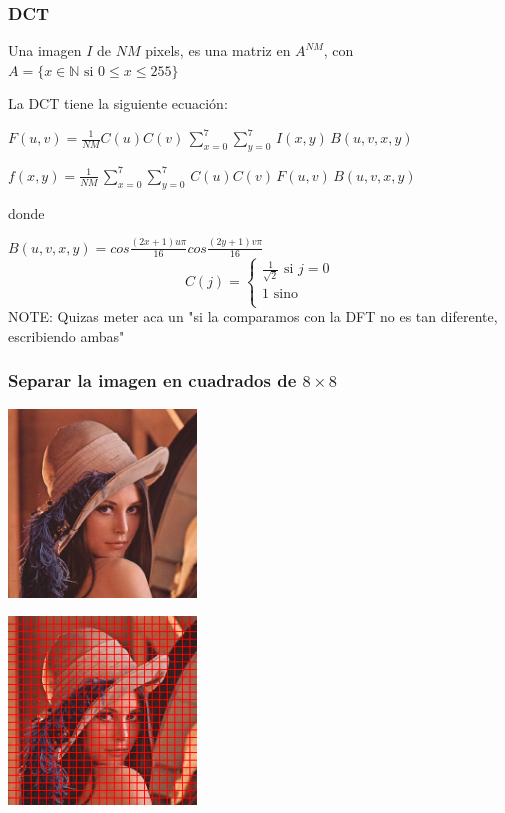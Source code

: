 \documentclass{beamer}
\begin{document}
\begin{frame}
    \frametitle{DCT}
    \begin{center}
        Una imagen $I$ de $NM$ pixels, es una matriz en $A^{NM}$, con $A = \{x \in \mathbb{N} \text{ si
        $0 \leq x \leq 255$}\}$ \vspace{6mm}

        La DCT tiene la siguiente ecuación:\vspace{6mm}

        $F(u,v)=\frac{1}{NM}C(u)C(v)\,\sum_{x=0}^{7} \sum_{y=0}^{7}\,I(x,y)\,B(u,v,x,y)$

        \vspace{3mm} 
        $f(x,y)=\frac{1}{NM}\,\sum_{x=0}^{7} \sum_{y=0}^{7}\,C(u)C(v)\,F(u,v)\,B(u,v,x,y)$

        \vspace{3mm}
        donde
        \vspace{3mm}

        $B(u,v,x,y) = cos\frac{(2x+1)u\pi}{16}cos\frac{(2y+1)v\pi}{16}$
        \[   
        C(j) = 
             \begin{cases}
                 \frac{1}{\sqrt{2}}\text{ si $j=0$}\\
                 1 \text{ sino}\\
             \end{cases}
        \]
        NOTE: Quizas meter aca un "si la comparamos con la DFT no es tan diferente, escribiendo
        ambas"
    \end{center}
\end{frame}

\begin{frame}
    \frametitle{Separar la imagen en cuadrados de $8 \times 8$}
    \begin{minipage}[t]{0.48\linewidth}
        \includegraphics[width=5cm, height=5cm]{fig/lena.png}
    \end{minipage}
    \hfill
    \begin{minipage}[t]{0.48\linewidth}
        \includegraphics[width=5cm, height=5cm]{fig/lena_blocks.png}
    \end{minipage}
\end{frame}
\end{document}
